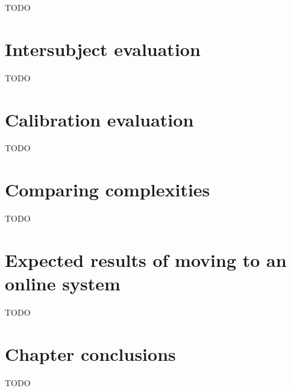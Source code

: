 TODO

\section{Intersubject evaluation}
\label{sec:evaluation_intersubject}


TODO

\section{Calibration evaluation}
\label{sec:evaluation_calibration}


TODO

\section{Comparing complexities}
\label{sec:evaluation_complexities}

TODO

\section{Expected results of moving to an online system}
\label{sec:evaluation_online}


TODO

\section{Chapter conclusions}
\label{sec:evaluation_conclusions}

TODO
